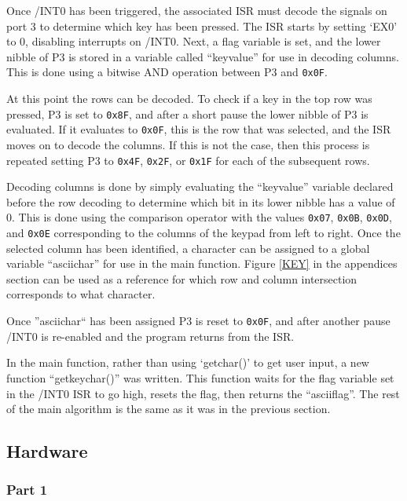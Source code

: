 \documentclass[12pt]{article}
\begin{document}
Once /INT0 has been triggered, the associated ISR must decode the signals on port 3 to determine which key has been pressed. The ISR starts by setting `EX0' to 0, disabling interrupts on /INT0. Next, a flag variable is set, and the lower nibble of P3 is stored in a variable called ``keyvalue'' for use in decoding columns. This is done using a bitwise AND operation between P3 and \texttt{0x0F}.

At this point the rows can be decoded. To check if a key in the top row was pressed, P3 is set to \texttt{0x8F}, and after a short pause the lower nibble of P3 is evaluated. If it evaluates to \texttt{0x0F}, this is the row that was selected, and the ISR moves on to decode the columns. If this is not the case, then this process is repeated setting P3 to \texttt{0x4F}, \texttt{0x2F}, or \texttt{0x1F} for each of the subsequent rows. 

Decoding columns is done by simply evaluating the ``keyvalue'' variable declared before the row decoding to determine which bit in its lower nibble has a value of 0. This is done using the comparison operator with the values \texttt{0x07}, \texttt{0x0B}, \texttt{0x0D}, and \texttt{0x0E} corresponding to the columns of the keypad from left to right. Once the selected column has been identified, a character can be assigned to a global variable ``asciichar'' for use in the main function. Figure \ref{KEY} in the appendices section can be used as a reference for which row and column intersection corresponds to what character. 

Once ''asciichar`` has been assigned P3 is reset to \texttt{0x0F}, and after another pause /INT0 is re-enabled and the program returns from the ISR.  

In the main function, rather than using `getchar()' to get user input, a new function ``getkeychar()'' was written. This function waits for the flag variable set in the /INT0 ISR to go high, resets the flag, then returns the ``asciiflag''. The rest of the main algorithm is the same as it was in the previous section.  

\subsection{Hardware}

\subsubsection{Part 1}
\end{document}
